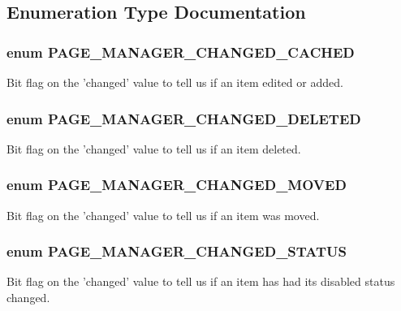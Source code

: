 \subsection{Enumeration Type Documentation}
\hypertarget{page__manager_8module_a1725bd9d5ce31fc2c3c71b9374cee612}{
\subsubsection[{PAGE\_\-MANAGER\_\-CHANGED\_\-CACHED}]{\setlength{\rightskip}{0pt plus 5cm}enum {\bf PAGE\_\-MANAGER\_\-CHANGED\_\-CACHED}}}
\label{page__manager_8module_a1725bd9d5ce31fc2c3c71b9374cee612}
Bit flag on the 'changed' value to tell us if an item edited or added. \hypertarget{page__manager_8module_a8b50720174159dd5fe0027078dc67c1b}{
\subsubsection[{PAGE\_\-MANAGER\_\-CHANGED\_\-DELETED}]{\setlength{\rightskip}{0pt plus 5cm}enum {\bf PAGE\_\-MANAGER\_\-CHANGED\_\-DELETED}}}
\label{page__manager_8module_a8b50720174159dd5fe0027078dc67c1b}
Bit flag on the 'changed' value to tell us if an item deleted. \hypertarget{page__manager_8module_a67a367c02b464d01501dd7977ff98d57}{
\subsubsection[{PAGE\_\-MANAGER\_\-CHANGED\_\-MOVED}]{\setlength{\rightskip}{0pt plus 5cm}enum {\bf PAGE\_\-MANAGER\_\-CHANGED\_\-MOVED}}}
\label{page__manager_8module_a67a367c02b464d01501dd7977ff98d57}
Bit flag on the 'changed' value to tell us if an item was moved. \hypertarget{page__manager_8module_a37b3f0cf36e7fd00e7868c8eb5bf449d}{
\subsubsection[{PAGE\_\-MANAGER\_\-CHANGED\_\-STATUS}]{\setlength{\rightskip}{0pt plus 5cm}enum {\bf PAGE\_\-MANAGER\_\-CHANGED\_\-STATUS}}}
\label{page__manager_8module_a37b3f0cf36e7fd00e7868c8eb5bf449d}
Bit flag on the 'changed' value to tell us if an item has had its disabled status changed. 

